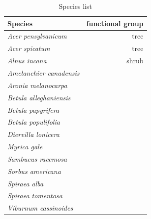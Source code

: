 \documentclass[12 pt]{article}
\begin{document}
\begin{table}[ht]
\centering
\caption{Species list} 
\label{listSp}
\begin{tabular}{lr}
  \hline
Species & functional group \\ 
  \hline
  \emph{Acer pensylvanicum} & tree    \\ 
  \emph{Acer spicatum} & tree   \\ 
   \emph{Alnus incana} & shrub  \\ 
   \emph{Amelanchier canadensis} &   \\ 
  \emph{Aronia melanocarpa} &  \\ 
  \emph{Betula alleghaniensis} &  \\ 
  \emph{Betula papyrifera} &   \\ 
  \emph{Betula populifolia} &   \\ 
  \emph{Diervilla lonicera} &   \\ 
  \emph{Myrica gale} &  \\ 
  \emph{Sambucus racemosa} &  \\ 
  \emph{Sorbus americana} &  \\
  \emph{Spiraea alba} &   \\ 
  \emph{Spiraea tomentosa} &   \\ 
  \emph{Viburnum cassinoides} &   \\ 
  \end{tabular}
\end{table}
\end{document}
